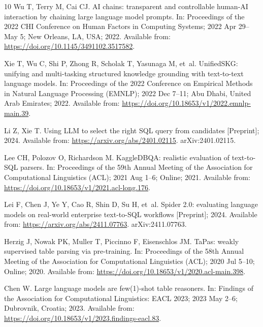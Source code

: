 \begin{thebibliography}{10}
Wu T, Terry M, Cai CJ.
\newblock AI chains: transparent and controllable human-AI interaction by
  chaining large language model prompts.
\newblock In: Proceedings of the 2022 CHI Conference on Human Factors in
  Computing Systems; 2022 Apr 29--May 5; New Orleans, LA, USA; 2022. Available
  from: \url{https://doi.org/10.1145/3491102.3517582}.

Xie T, Wu C, Shi P, Zhong R, Scholak T, Yasunaga M, et~al.
\newblock UnifiedSKG: unifying and multi-tasking structured knowledge grounding
  with text-to-text language models.
\newblock In: Proceedings of the 2022 Conference on Empirical Methods in
  Natural Language Processing (EMNLP); 2022 Dec 7--11; Abu Dhabi, United Arab
  Emirates; 2022. Available from:
  \url{https://doi.org/10.18653/v1/2022.emnlp-main.39}.

Li Z, Xie T.
\newblock Using LLM to select the right SQL query from candidates [Preprint];
  2024.
\newblock Available from: \url{https://arxiv.org/abs/2401.02115}.
\newblock arXiv:2401.02115.

Lee CH, Polozov O, Richardson M.
\newblock KaggleDBQA: realistic evaluation of text-to-SQL parsers.
\newblock In: Proceedings of the 59th Annual Meeting of the Association for
  Computational Linguistics (ACL); 2021 Aug 1--6; Online; 2021. Available from:
  \url{https://doi.org/10.18653/v1/2021.acl-long.176}.

Lei F, Chen J, Ye Y, Cao R, Shin D, Su H, et~al.
\newblock Spider 2.0: evaluating language models on real-world enterprise
  text-to-SQL workflows [Preprint]; 2024.
\newblock Available from: \url{https://arxiv.org/abs/2411.07763}.
\newblock arXiv:2411.07763.

Herzig J, Nowak PK, Muller T, Piccinno F, Eisenschlos JM.
\newblock TaPas: weakly supervised table parsing via pre-training.
\newblock In: Proceedings of the 58th Annual Meeting of the Association for
  Computational Linguistics (ACL); 2020 Jul 5--10; Online; 2020. Available
  from: \url{https://doi.org/10.18653/v1/2020.acl-main.398}.

Chen W.
\newblock Large language models are few(1)-shot table reasoners.
\newblock In: Findings of the Association for Computational Linguistics: EACL
  2023; 2023 May 2--6; Dubrovnik, Croatia; 2023. Available from:
  \url{https://doi.org/10.18653/v1/2023.findings-eacl.83}.


\end{thebibliography}
